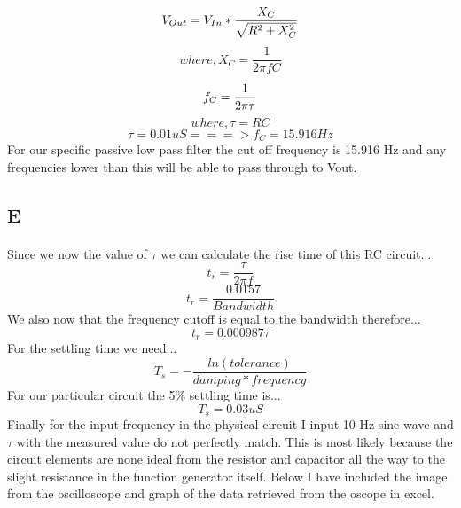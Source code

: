 \documentclass[12pt]{article}
\begin{document}
				\begin{equation}
					V_{Out} = V_{In}*\frac{X_{C}}{\sqrt{R^2+X_C^2}}\\
				\end{equation}
				\begin{equation}
					where, X_C = \frac{1}{2 \pi fC}
				\end{equation}

				\begin{equation}
					f_C = \frac{1}{2 \pi \tau}\\
				\end{equation}
				\begin{equation}
					where, \tau = RC
				\end{equation}
				\begin{equation}
					\tau = 0.01 uS===>f_C = 15.916 Hz
				\end{equation}
				For our specific passive low pass filter the cut off frequency is 15.916 Hz and any frequencies lower than this will be able to pass 
				through to Vout.

		\subsection{E}
			\paragraph{}
				Since we now the value of $\tau$ we can calculate the rise time of this RC circuit...
				\begin{equation}
					t_r = \frac{\tau}{2 \pi f}
				\end{equation}
				\begin{equation}
					t_r = \frac{0.0157}{Bandwidth}
				\end{equation}
				We also now that the frequency cutoff is equal to the bandwidth therefore...
				\begin{equation}
					t_r = 0.000987\tau
				\end{equation}
				For the settling time we need...
				\begin{equation}
					T_s = -\frac{ln(tolerance)}{damping*frequency}
				\end{equation}
				For our particular circuit the 5\% settling time is...
				\begin{equation}
					T_s = 0.03 uS
				\end{equation}
				Finally for the input frequency in the physical circuit I input 10 Hz sine wave and $\tau$ with the measured value do not perfectly match.  
				This is most likely because the circuit elements are none ideal from the resistor and capacitor all the way to the slight resistance in the 
				function generator itself.  Below I have included the image from the oscilloscope and graph of the data retrieved from the oscope in 
				excel.
\end{document}
